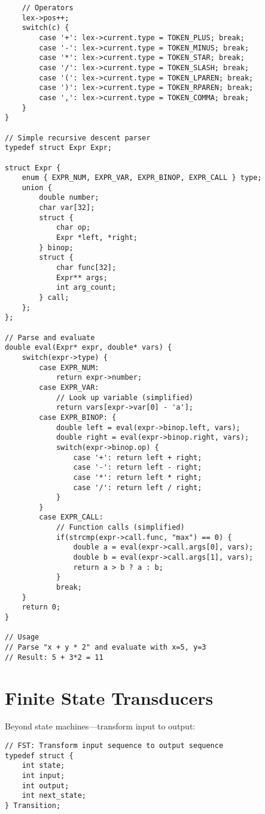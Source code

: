 \begin{description}[style=nextline,leftmargin=0pt]
\begin{lstlisting}
    // Operators
    lex->pos++;
    switch(c) {
        case '+': lex->current.type = TOKEN_PLUS; break;
        case '-': lex->current.type = TOKEN_MINUS; break;
        case '*': lex->current.type = TOKEN_STAR; break;
        case '/': lex->current.type = TOKEN_SLASH; break;
        case '(': lex->current.type = TOKEN_LPAREN; break;
        case ')': lex->current.type = TOKEN_RPAREN; break;
        case ',': lex->current.type = TOKEN_COMMA; break;
    }
}

// Simple recursive descent parser
typedef struct Expr Expr;

struct Expr {
    enum { EXPR_NUM, EXPR_VAR, EXPR_BINOP, EXPR_CALL } type;
    union {
        double number;
        char var[32];
        struct {
            char op;
            Expr *left, *right;
        } binop;
        struct {
            char func[32];
            Expr** args;
            int arg_count;
        } call;
    };
};

// Parse and evaluate
double eval(Expr* expr, double* vars) {
    switch(expr->type) {
        case EXPR_NUM:
            return expr->number;
        case EXPR_VAR:
            // Look up variable (simplified)
            return vars[expr->var[0] - 'a'];
        case EXPR_BINOP: {
            double left = eval(expr->binop.left, vars);
            double right = eval(expr->binop.right, vars);
            switch(expr->binop.op) {
                case '+': return left + right;
                case '-': return left - right;
                case '*': return left * right;
                case '/': return left / right;
            }
        }
        case EXPR_CALL:
            // Function calls (simplified)
            if(strcmp(expr->call.func, "max") == 0) {
                double a = eval(expr->call.args[0], vars);
                double b = eval(expr->call.args[1], vars);
                return a > b ? a : b;
            }
            break;
    }
    return 0;
}

// Usage
// Parse "x + y * 2" and evaluate with x=5, y=3
// Result: 5 + 3*2 = 11
\end{lstlisting}

\section{Finite State Transducers}

Beyond state machines---transform input to output:

\begin{lstlisting}
// FST: Transform input sequence to output sequence
typedef struct {
    int state;
    int input;
    int output;
    int next_state;
} Transition;


\end{lstlisting}
\end{description}

